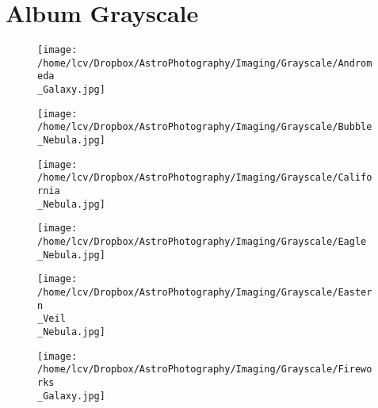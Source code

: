 \section{Album Grayscale}
\begin{figure}[phbt]
	\texttt{[image: /home/lcv/Dropbox/AstroPhotography/Imaging/Grayscale/Andromeda\\\_Galaxy.jpg]}


\end{figure}
\newpage
\begin{figure}[phbt]
	\texttt{[image: /home/lcv/Dropbox/AstroPhotography/Imaging/Grayscale/Bubble\\\_Nebula.jpg]}


\end{figure}
\newpage
\begin{figure}[phbt]
	\texttt{[image: /home/lcv/Dropbox/AstroPhotography/Imaging/Grayscale/California\\\_Nebula.jpg]}


\end{figure}
\newpage
\begin{figure}[phbt]
	\texttt{[image: /home/lcv/Dropbox/AstroPhotography/Imaging/Grayscale/Eagle\\\_Nebula.jpg]}


\end{figure}
\newpage
\begin{figure}[phbt]
	\texttt{[image: /home/lcv/Dropbox/AstroPhotography/Imaging/Grayscale/Eastern\\\_Veil\\\_Nebula.jpg]}


\end{figure}
\newpage
\begin{figure}[phbt]
	\texttt{[image: /home/lcv/Dropbox/AstroPhotography/Imaging/Grayscale/Fireworks\\\_Galaxy.jpg]}


\end{figure}
